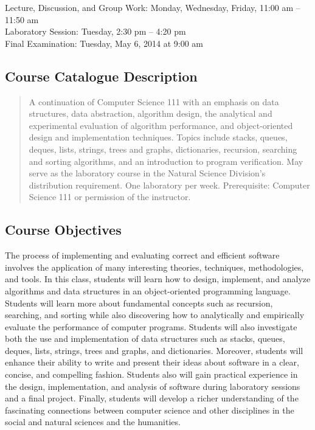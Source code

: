 Lecture, Discussion, and Group Work: Monday, Wednesday, Friday, 11:00 am -- 11:50 am\\
Laboratory Session: Tuesday, 2:30 pm -- 4:20 pm \\
Final Examination: Tuesday, May 6, 2014 at 9:00 am

\subsection*{Course Catalogue Description}

\begin{quote}

A continuation of Computer Science 111 with an emphasis on data structures, data abstraction, algorithm design, the
analytical and experimental evaluation of algorithm performance, and object-oriented design and implementation
techniques. Topics include stacks, queues, deques, lists, strings, trees and graphs, dictionaries, recursion, searching
and sorting algorithms, and an introduction to program verification. May serve as the laboratory course in the Natural
Science Division’s distribution requirement. One laboratory per week.  Prerequisite: Computer Science 111 or permission
of the instructor.

\end{quote}

\subsection*{Course Objectives}

The process of implementing and evaluating correct and efficient software involves the application of many interesting
theories, techniques, methodologies, and tools.  In this class, students will learn how to design, implement, and
analyze algorithms and data structures in an object-oriented programming language. Students will learn more about
fundamental concepts such as recursion, searching, and sorting while also discovering how to analytically and
empirically evaluate the performance of computer programs. Students will also investigate both the use and
implementation of data structures such as stacks, queues, deques, lists, strings, trees and graphs, and dictionaries.
Moreover, students will enhance their ability to write and present their ideas about software in a clear, concise, and
compelling fashion.  Students also will gain practical experience in the design, implementation, and analysis of
software during laboratory sessions and a final project. Finally, students will develop a richer understanding of the
fascinating connections between computer science and other disciplines in the social and natural sciences and the
humanities.

